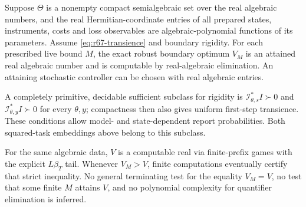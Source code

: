 \begin{theorem}\label{thm:r67-algebraic-memory}
Suppose $\Theta$ is a nonempty compact semialgebraic set over the real algebraic numbers, and the real Hermitian-coordinate entries of all prepared states, instruments, costs and loss observables are algebraic-polynomial functions of its parameters. Assume \eqref{eq:r67-transience} and boundary rigidity. For each prescribed live bound $M$, the exact robust boundary optimum $V_M$ is an attained real algebraic number and is computable by real-algebraic elimination. An attaining stochastic controller can be chosen with real algebraic entries.

A completely primitive, decidable sufficient subclass for rigidity is
$\mathcal I_{\theta,s}^*I\succ0$ and $\mathcal I_{\theta,y}^*I\succ0$ for every $\theta,y$; compactness then also gives uniform first-step transience. These conditions allow model- and state-dependent report probabilities. Both squared-task embeddings above belong to this subclass.

For the same algebraic data, $V$ is a computable real via finite-prefix games with the explicit $L\beta_T$ tail. Whenever $V_M>V$, finite computations eventually certify that strict inequality. No general terminating test for the equality $V_M=V$, no test that some finite $M$ attains $V$, and no polynomial complexity for quantifier elimination is inferred.
\end{theorem}
